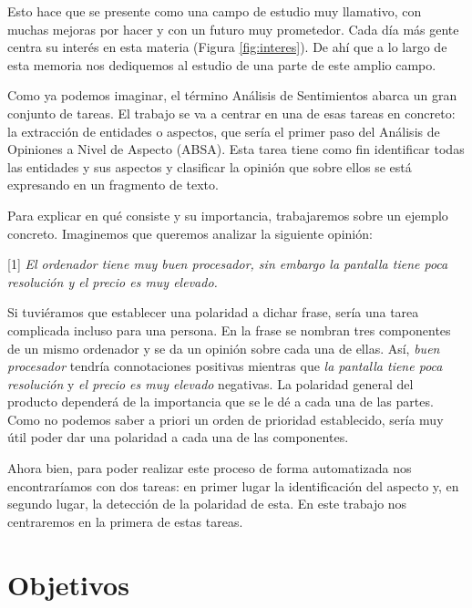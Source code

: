 	 Esto hace que se presente como una campo de estudio muy llamativo, con muchas mejoras por hacer y con un futuro muy prometedor. Cada día más gente centra su interés en esta materia (Figura \ref{fig:interes}). De ahí que a lo largo de esta memoria nos dediquemos al estudio de una parte de este amplio campo.
	 

	Como ya podemos imaginar, el término Análisis de Sentimientos abarca un gran conjunto de tareas. El trabajo se va a centrar en una de esas tareas en concreto: la extracción de entidades o aspectos, que sería el primer paso del Análisis de Opiniones a Nivel de Aspecto (ABSA). Esta tarea tiene como fin identificar todas las entidades y sus aspectos y clasificar la opinión que sobre ellos se está expresando en un fragmento de texto. 

	Para explicar en qué consiste y su importancia, trabajaremos sobre un ejemplo concreto. Imaginemos que queremos analizar la siguiente opinión:
	
	\begin{center}
		\begin{minipage}{0.9\linewidth}
			\vspace{5pt}%
			{\small
				[1] \textit{El ordenador tiene muy buen procesador, sin embargo la pantalla tiene poca resolución y el precio es muy elevado.}
			}
			\vspace{5pt}%
		\end{minipage}
	\end{center}

	Si tuviéramos que establecer una polaridad a dichar frase, sería una tarea complicada incluso para una persona. En la frase se nombran tres componentes de un mismo ordenador y se da un opinión sobre cada una de ellas. Así, \textit{buen procesador} tendría connotaciones positivas mientras que \textit{la pantalla tiene poca resolución} y \textit{el precio es muy elevado} negativas. La polaridad general del producto dependerá de la importancia que se le dé a cada una de las partes. Como no podemos saber a priori un orden de prioridad establecido, sería muy útil poder dar una polaridad a cada una de las componentes.
	
	Ahora bien, para poder realizar este proceso de forma automatizada nos encontraríamos con dos tareas: en primer lugar la identificación del aspecto y, en segundo lugar, la detección de la polaridad de esta. En este trabajo nos centraremos en la primera de estas tareas. 

	\section{Objetivos} \label{objetivos}
	
